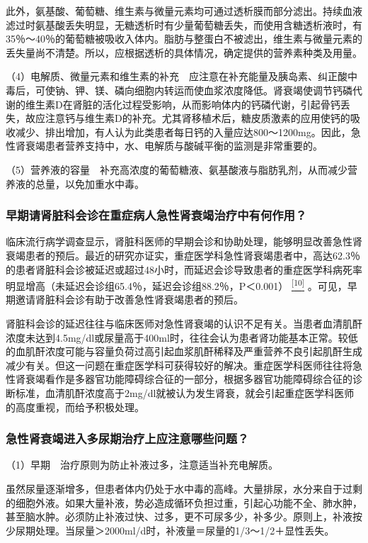 此外，氨基酸、葡萄糖、维生素与微量元素均可通过透析膜而部分滤出。持续血液滤过时氨基酸丢失明显，无糖透析时有少量葡萄糖丢失，而使用含糖透析液时，有35％～40％的葡萄糖被吸收入体内。脂肪与整蛋白不被滤出，维生素与微量元素的丢失量尚不清楚。所以，应根据透析的具体情况，确定提供的营养素种类及用量。

（4）电解质、微量元素和维生素的补充　应注意在补充能量及胰岛素、纠正酸中毒后，可使钠、钾、镁、磷向细胞内转运而使血浆浓度降低。肾衰竭使调节钙磷代谢的维生素D在肾脏的活化过程受影响，从而影响体内的钙磷代谢，引起骨钙丢失，故应注意钙与维生素D的补充。尤其肾移植术后，糖皮质激素的应用使钙的吸收减少、排出增加，有人认为此类患者每日钙的入量应达800～1200mg。因此，急性肾衰竭患者营养支持中，水、电解质与酸碱平衡的监测是非常重要的。

（5）营养液的容量　补充高浓度的葡萄糖液、氨基酸液与脂肪乳剂，从而减少营养液的总量，以免加重水中毒。

\subsubsection{早期请肾脏科会诊在重症病人急性肾衰竭治疗中有何作用？}

临床流行病学调查显示，肾脏科医师的早期会诊和协助处理，能够明显改善急性肾衰竭患者的预后。最近的研究亦证实，重症医学科急性肾衰竭患者中，高达62.3％的患者肾脏科会诊被延迟或超过48小时，而延迟会诊导致患者的重症医学科病死率明显增高（未延迟会诊组65.4％，延迟会诊组88.2％，P＜0.001）
\protect\hyperlink{text00017.htmlux5cux23ch10-16}{\textsuperscript{{[}10{]}}}
。可见，早期邀请肾脏科会诊有助于改善急性肾衰竭患者的预后。

肾脏科会诊的延迟往往与临床医师对急性肾衰竭的认识不足有关。当患者血清肌酐浓度未达到4.5mg/dl或尿量高于400ml时，往往会认为患者肾功能基本正常。较低的血肌酐浓度可能与容量负荷过高引起血浆肌酐稀释及严重营养不良引起肌酐生成减少有关。但这一问题在重症医学科可获得较好的解决。重症医学科医师往往将急性肾衰竭看作是多器官功能障碍综合征的一部分，根据多器官功能障碍综合征的诊断标准，血清肌酐浓度高于2mg/dl就被认为发生肾衰，就会引起重症医学科医师的高度重视，而给予积极处理。

\subsubsection{急性肾衰竭进入多尿期治疗上应注意哪些问题？}

（1）早期　治疗原则为防止补液过多，注意适当补充电解质。

虽然尿量逐渐增多，但患者体内仍处于水中毒的高峰。大量排尿，水分来自于过剩的细胞外液。如果大量补液，势必造成循环负担过重，引起心功能不全、肺水肿，甚至脑水肿。必须防止补液过快、过多，更不可尿多少，补多少。原则上，补液按少尿期处理。当尿量＞2000ml/d时，补液量＝尿量的1/3～1/2＋显性丢失。

